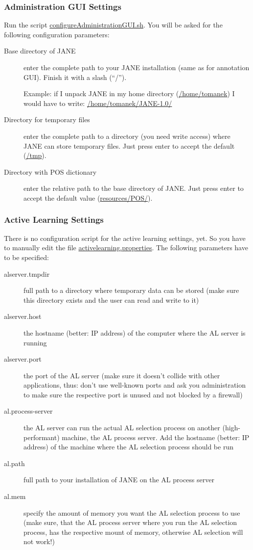 \documentclass[DIV12,english,11pt,halfparskip]{scrartcl}
\begin{document}
\subsubsection{Administration GUI Settings}
Run the script \url{configureAdministrationGUI.sh}. You will be asked for
the following configuration parameters:

\begin{description}

\item [Base directory of JANE] enter the complete path to your JANE
  installation (same as for annotation GUI). Finish it with a slash
  (``/'').

  Example: if I unpack JANE in my home directory (\url{/home/tomanek})
  I would have to write: \url{/home/tomanek/JANE-1.0/}

\item[Directory for temporary files] enter the complete path to a
  directory (you need write access) where JANE can store
  temporary files. Just press enter to accept the default (\url{/tmp}).

\item[Directory with POS dictionary] enter the relative path to the
  base directory of JANE. Just press enter to accept the default value
  (\url{resources/POS/}).
\end{description}


\subsubsection{Active Learning Settings}
There is no configuration script for the active learning settings,
yet. So you have to manually edit the file
\url{activelearning.properties}. The following parameters have to be
specified:

\begin{description}
\item[alserver.tmpdir] full path to a directory where temporary data
  can be stored (make sure this directory exists and the user can read
  and write to it)
\item[alserver.host] the hostname (better: IP address) of the computer
  where the AL server is running
\item[alserver.port] the port of the AL server (make sure it doesn't
  collide with other applications, thus: don't use well-known ports
  and ask you administration to make sure the respective port is
  unused and not blocked by a firewall)
\item[al.process-server] the AL server can run the actual AL selection
  process on another (high-performant) machine, the AL process server.
  Add the hostname (better: IP address) of the machine where the AL
  selection process should be run
\item[al.path] full path to your installation of JANE on the AL
  process server
\item[al.mem] specify the amount of memory you want the AL selection
  process to use (make sure, that the AL process server where you run the AL
  selection process, has the respective mount of memory, otherwise AL
  selection will not work!)
\end{description}
\end{document}
